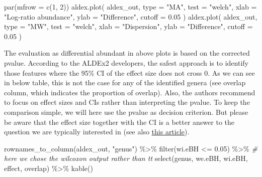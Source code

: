 \documentclass[
]{book}
\newenvironment{Shaded}{\begin{snugshade}}{\end{snugshade}}
\newcommand{\AttributeTok}[1]{\textcolor[rgb]{0.77,0.63,0.00}{#1}}
\newcommand{\CommentTok}[1]{\textcolor[rgb]{0.56,0.35,0.01}{\textit{#1}}}
\newcommand{\DecValTok}[1]{\textcolor[rgb]{0.00,0.00,0.81}{#1}}
\newcommand{\FloatTok}[1]{\textcolor[rgb]{0.00,0.00,0.81}{#1}}
\newcommand{\FunctionTok}[1]{\textcolor[rgb]{0.00,0.00,0.00}{#1}}
\newcommand{\NormalTok}[1]{#1}
\newcommand{\SpecialCharTok}[1]{\textcolor[rgb]{0.00,0.00,0.00}{#1}}
\newcommand{\StringTok}[1]{\textcolor[rgb]{0.31,0.60,0.02}{#1}}
\begin{document}
\begin{Shaded}
\begin{Highlighting}[]
\FunctionTok{par}\NormalTok{(}\AttributeTok{mfrow =} \FunctionTok{c}\NormalTok{(}\DecValTok{1}\NormalTok{, }\DecValTok{2}\NormalTok{))}
  \FunctionTok{aldex.plot}\NormalTok{(}
\NormalTok{    aldex\_out, }
    \AttributeTok{type =} \StringTok{"MA"}\NormalTok{, }
    \AttributeTok{test =} \StringTok{"welch"}\NormalTok{, }
    \AttributeTok{xlab =} \StringTok{"Log{-}ratio abundance"}\NormalTok{,}
    \AttributeTok{ylab =} \StringTok{"Difference"}\NormalTok{,}
    \AttributeTok{cutoff =} \FloatTok{0.05}
\NormalTok{  )}
  \FunctionTok{aldex.plot}\NormalTok{(}
\NormalTok{    aldex\_out, }
    \AttributeTok{type =} \StringTok{"MW"}\NormalTok{, }
    \AttributeTok{test =} \StringTok{"welch"}\NormalTok{,}
    \AttributeTok{xlab =} \StringTok{"Dispersion"}\NormalTok{,}
    \AttributeTok{ylab =} \StringTok{"Difference"}\NormalTok{,}
    \AttributeTok{cutoff =} \FloatTok{0.05}
\NormalTok{  )}
\end{Highlighting}
\end{Shaded}

The evaluation as differential abundant in above plots is based on the
corrected pvalue. According to the ALDEx2 developers, the safest
approach is to identify those features where the 95\% CI of the effect
size does not cross 0. As we can see in below table, this is not the
case for any of the identified genera (see overlap column, which
indicates the proportion of overlap). Also, the authors recommend to
focus on effect sizes and CIs rather than interpreting the pvalue. To
keep the comparison simple, we will here use the pvalue as decision
criterion. But please be aware that the effect size together with the
CI is a better answer to the question we are typically interested in
(see also \href{https://www.nature.com/articles/d41586-019-00857-9}{this
article}).

\begin{Shaded}
\begin{Highlighting}[]
\FunctionTok{rownames\_to\_column}\NormalTok{(aldex\_out, }\StringTok{"genus"}\NormalTok{) }\SpecialCharTok{\%\textgreater{}\%}
  \FunctionTok{filter}\NormalTok{(wi.eBH }\SpecialCharTok{\textless{}=} \FloatTok{0.05}\NormalTok{)  }\SpecialCharTok{\%\textgreater{}\%} \CommentTok{\# here we chose the wilcoxon output rather than tt}
  \FunctionTok{select}\NormalTok{(genus, we.eBH, wi.eBH, effect, overlap) }\SpecialCharTok{\%\textgreater{}\%}
  \FunctionTok{kable}\NormalTok{()}
\end{Highlighting}
\end{Shaded}
\end{document}
